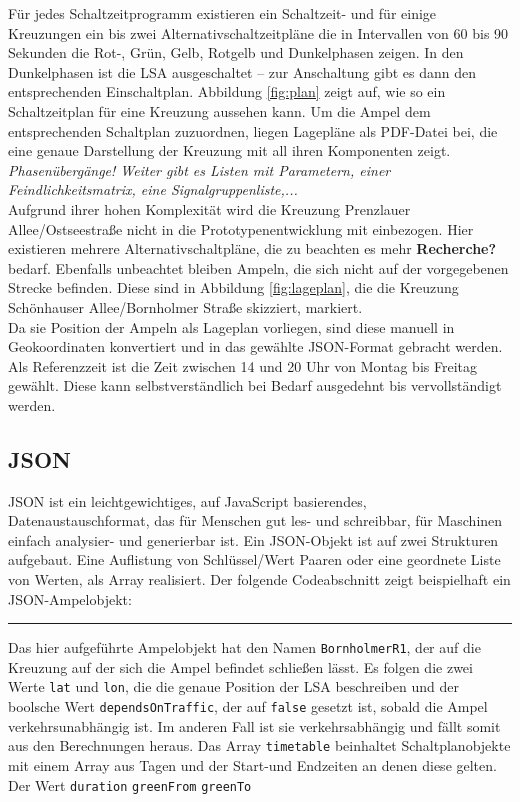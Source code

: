 Für jedes Schaltzeitprogramm existieren ein Schaltzeit- und für einige Kreuzungen ein bis zwei Alternativschaltzeitpläne die in Intervallen von 60 bis 90 Sekunden die Rot-, Grün, Gelb, Rotgelb und Dunkelphasen zeigen. In den Dunkelphasen ist die \gls{LSA} ausgeschaltet -- zur Anschaltung gibt es dann den entsprechenden Einschaltplan. Abbildung \ref{fig:plan} zeigt auf, wie so ein Schaltzeitplan für eine Kreuzung aussehen kann. Um die Ampel dem entsprechenden Schaltplan zuzuordnen, liegen Lagepläne als \gls{PDF}-Datei bei, die eine genaue Darstellung der Kreuzung mit all ihren Komponenten zeigt. \textit{Phasenübergänge! Weiter gibt es Listen mit Parametern, einer Feindlichkeitsmatrix, eine Signalgruppenliste,...}\\
Aufgrund ihrer hohen Komplexität wird die Kreuzung Prenzlauer Allee/Ostseestraße nicht in die Prototypenentwicklung mit einbezogen. Hier existieren mehrere Alternativschaltpläne, die zu beachten es mehr \textbf{Recherche?} bedarf. Ebenfalls unbeachtet bleiben Ampeln, die sich nicht auf der vorgegebenen Strecke befinden. Diese sind in Abbildung \ref{fig:lageplan}, die die Kreuzung Schönhauser Allee/Bornholmer Straße skizziert, markiert.\\
Da sie Position der Ampeln als Lageplan vorliegen, sind diese manuell in Geokoordinaten konvertiert und in das gewählte \gls{JSON}-Format gebracht werden.
Als Referenzzeit ist die Zeit zwischen 14 und 20 Uhr von Montag bis Freitag gewählt. Diese kann selbstverständlich bei Bedarf ausgedehnt bis vervollständigt werden.
\subsection[JSON]{\gls{JSON}}
\gls{JSON} ist ein leichtgewichtiges, auf JavaScript basierendes, Datenaustauschformat, das für Menschen gut les- und schreibbar, für Maschinen einfach analysier- und generierbar ist. Ein \gls{JSON}-Objekt ist auf zwei Strukturen aufgebaut. Eine Auflistung von Schlüssel/Wert Paaren oder eine geordnete Liste von Werten, als Array realisiert. Der folgende Codeabschnitt zeigt beispielhaft ein \gls{JSON}-Ampelobjekt:  

\rule{35em}{0.5pt}
Das hier aufgeführte Ampelobjekt hat den Namen \texttt{BornholmerR1}, der auf die Kreuzung auf der sich die Ampel befindet schließen lässt. Es folgen die zwei Werte \texttt{lat} und \texttt{lon}, die die genaue Position der \gls{LSA} beschreiben und der boolsche Wert \texttt{dependsOnTraffic}, der auf \texttt{false} gesetzt ist, sobald die Ampel verkehrsunabhängig ist. Im anderen Fall ist sie verkehrsabhängig und fällt somit aus den Berechnungen heraus. Das Array \texttt{timetable} beinhaltet Schaltplanobjekte mit einem Array aus Tagen und der Start-und Endzeiten an denen diese gelten. Der Wert \texttt{duration}   \texttt{greenFrom} \texttt{greenTo}
